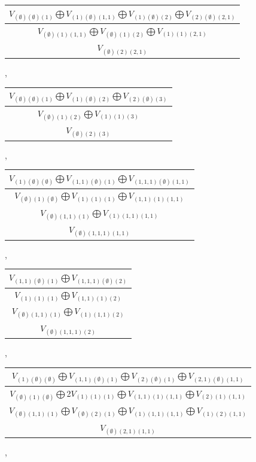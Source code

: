 \documentclass[letterpaper,11pt]{article}
\begin{document}
	\begin{tabular}{| c |}
		\hline
		$V_{(\emptyset)(\emptyset)(1)}$$\bigoplus$$V_{(1)(\emptyset)(1,1)}$$\bigoplus$$V_{(1)(\emptyset)(2)}$$\bigoplus$$V_{(2)(\emptyset)(2,1)}$\\
		\hline
		$V_{(\emptyset)(1)(1,1)}$$\bigoplus$$V_{(\emptyset)(1)(2)}$$\bigoplus$$V_{(1)(1)(2,1)}$\\
		\hline
		$V_{(\emptyset)(2)(2,1)}$\\
		\hline
	\end{tabular}, 
	\newline 
	\begin{tabular}{| c |}
		\hline
		$V_{(\emptyset)(\emptyset)(1)}$$\bigoplus$$V_{(1)(\emptyset)(2)}$$\bigoplus$$V_{(2)(\emptyset)(3)}$\\
		\hline
		$V_{(\emptyset)(1)(2)}$$\bigoplus$$V_{(1)(1)(3)}$\\
		\hline
		$V_{(\emptyset)(2)(3)}$\\
		\hline
	\end{tabular}, 
	\begin{tabular}{| c |}
		\hline
		$V_{(1)(\emptyset)(\emptyset)}$$\bigoplus$$V_{(1,1)(\emptyset)(1)}$$\bigoplus$$V_{(1,1,1)(\emptyset)(1,1)}$\\
		\hline
		$V_{(\emptyset)(1)(\emptyset)}$$\bigoplus$$V_{(1)(1)(1)}$$\bigoplus$$V_{(1,1)(1)(1,1)}$\\
		\hline
		$V_{(\emptyset)(1,1)(1)}$$\bigoplus$$V_{(1)(1,1)(1,1)}$\\
		\hline
		$V_{(\emptyset)(1,1,1)(1,1)}$\\
		\hline
	\end{tabular}, 
	\begin{tabular}{| c |}
		\hline
		$V_{(1,1)(\emptyset)(1)}$$\bigoplus$$V_{(1,1,1)(\emptyset)(2)}$\\
		\hline
		$V_{(1)(1)(1)}$$\bigoplus$$V_{(1,1)(1)(2)}$\\
		\hline
		$V_{(\emptyset)(1,1)(1)}$$\bigoplus$$V_{(1)(1,1)(2)}$\\
		\hline
		$V_{(\emptyset)(1,1,1)(2)}$\\
		\hline
	\end{tabular}, 
	\newline 
	\begin{tabular}{| c |}
		\hline
		$V_{(1)(\emptyset)(\emptyset)}$$\bigoplus$$V_{(1,1)(\emptyset)(1)}$$\bigoplus$$V_{(2)(\emptyset)(1)}$$\bigoplus$$V_{(2,1)(\emptyset)(1,1)}$\\
		\hline
		$V_{(\emptyset)(1)(\emptyset)}$$\bigoplus$2$V_{(1)(1)(1)}$$\bigoplus$$V_{(1,1)(1)(1,1)}$$\bigoplus$$V_{(2)(1)(1,1)}$\\
		\hline
		$V_{(\emptyset)(1,1)(1)}$$\bigoplus$$V_{(\emptyset)(2)(1)}$$\bigoplus$$V_{(1)(1,1)(1,1)}$$\bigoplus$$V_{(1)(2)(1,1)}$\\
		\hline
		$V_{(\emptyset)(2,1)(1,1)}$\\
		\hline
	\end{tabular}, 
\end{document}
